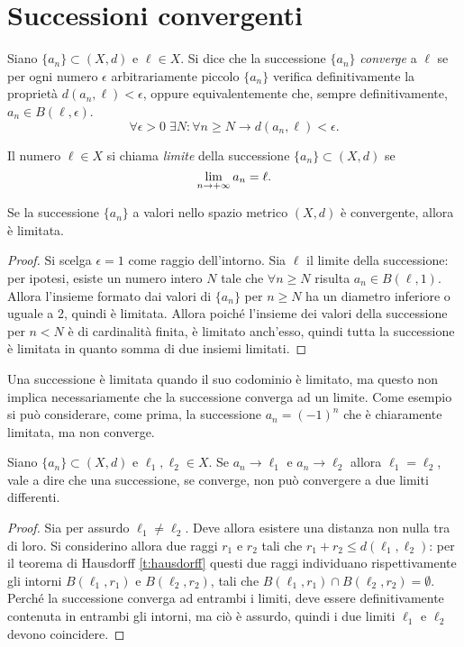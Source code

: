 \section{Successioni convergenti}
\begin{definizione}
Siano $\{a_n\}\subset(X,d)$ e $\ell\in X$. Si dice che la successione $\{a_n\}$ \emph{converge} a $\ell$ se per ogni numero $\epsilon$ arbitrariamente piccolo $\{a_n\}$ verifica definitivamente la proprietà $d(a_n,\ell)<\epsilon$, oppure equivalentemente che, sempre definitivamente, $a_n\in B(\ell,\epsilon)$.
\[
\forall\epsilon >0\;\exists N\colon\forall n\geq N\to d(a_n,\ell)<\epsilon.
\]
\end{definizione}
\begin{definizione}
Il numero $\ell\in X$ si chiama \emph{limite} della successione $\{a_n\}\subset(X,d)$ se
\[
\lim_{n\to +\infty}a_n=\ell.
\]
\end{definizione}
\begin{teorema}
\label{t:succ_limitata}
Se la successione $\{a_n\}$ a valori nello spazio metrico $(X,d)$ è convergente, allora è limitata.
\end{teorema}
\begin{proof}
Si scelga $\epsilon=1$ come raggio dell'intorno. Sia $\ell$ il limite della successione: per ipotesi, esiste un numero intero $N$ tale che $\forall n\geq N$ risulta $a_n\in B(\ell,1)$. Allora l'insieme formato dai valori di $\{a_n\}$ per $n\geq N$ ha un diametro inferiore o uguale a 2, quindi è limitata. Allora poiché l'insieme dei valori della successione per $n<N$ è di cardinalità finita, è limitato anch'esso, quindi tutta la successione è limitata in quanto somma di due insiemi limitati.
\end{proof}
Una successione è limitata quando il suo codominio è limitato, ma questo non implica necessariamente che la successione converga ad un limite. Come esempio si può considerare, come prima, la successione $a_n=(-1)^n$ che è chiaramente limitata, ma non converge.
\begin{teorema} \label{t:unicita_limite}
Siano $\{a_n\}\subset(X,d)$ e $\ell_1,\ell_2\in X$. Se $a_n\to\ell_1$ e $a_n\to\ell_2$ allora $\ell_1=\ell_2$, vale a dire che una successione, se converge, non può convergere a due limiti differenti.
\end{teorema}
\begin{proof}
Sia per assurdo $\ell_1\neq\ell_2$. Deve allora esistere una distanza non nulla tra di loro. Si considerino allora due raggi $r_1$ e $r_2$ tali che $r_1+r_2\leq d(\ell_1,\ell_2)$: per il teorema di Hausdorff \ref{t:hausdorff} questi due raggi individuano rispettivamente gli intorni $B(\ell_1,r_1)$ e $B(\ell_2,r_2)$, tali che $B(\ell_1,r_1)\cap B(\ell_2,r_2)=\emptyset$. Perché la successione converga ad entrambi i limiti, deve essere definitivamente contenuta in entrambi gli intorni, ma ciò è assurdo, quindi i due limiti $\ell_1$ e $\ell_2$ devono coincidere.
\end{proof}

